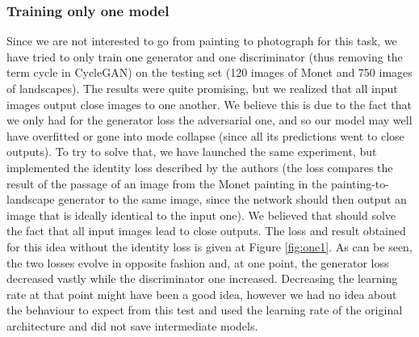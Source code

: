 \documentclass[twocolumn,superscriptaddress,aps,floatfix, nofootinbib]{revtex4-1}
\begin{document}
    \subsubsection{Training only one model}
    
    Since we are not interested to go from painting to photograph for this task, we have tried to only train one generator and one discriminator (thus removing the term cycle in CycleGAN) on the testing set (120 images of Monet and 750 images of landscapes). The results were quite promising, but we realized that all input images output close images to one another. We believe this is due to the fact that we only had for the generator loss the adversarial one, and so our model may well have overfitted or gone into mode collapse (since all its predictions went to close outputs). To try to solve that, we have launched the same experiment, but implemented the identity loss described by the authors (the loss compares the result of the passage of an image from the Monet painting in the painting-to-landscape generator to the same image, since the network should then output an image that is ideally identical to the input one). We believed that should solve the fact that all input images lead to close outputs. The loss and result obtained for this idea without the identity loss is given at Figure \ref{fig:one1}. As can be seen, the two losses evolve in opposite fashion and, at one point, the generator loss decreased vastly while the discriminator one increased. Decreasing the learning rate at that point might have been a good idea, however we had no idea about the behaviour to expect from this test and used the learning rate of the original architecture and did not save intermediate models.
    
\end{document}
